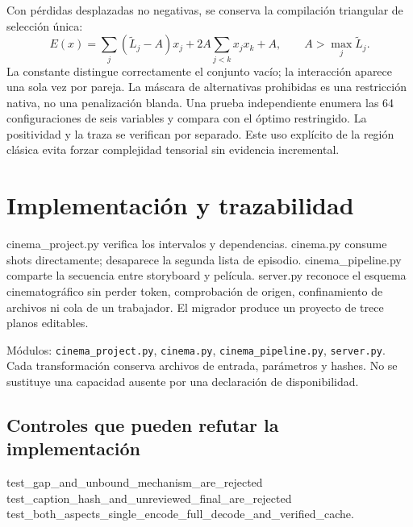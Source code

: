 \documentclass[10pt,a4paper]{article}
\begin{document}
Con pérdidas desplazadas no negativas, se conserva la compilación triangular de selección única:
\begin{equation}
E(x)=\sum_j(\widetilde L_j-A)x_j+2A\sum_{j<k}x_jx_k+A,\qquad A>\max_j\widetilde L_j.
\end{equation}
La constante distingue correctamente el conjunto vacío; la interacción aparece una sola vez por pareja. La máscara de alternativas prohibidas es una restricción nativa, no una penalización blanda. Una prueba independiente enumera las 64 configuraciones de seis variables y compara con el óptimo restringido. La positividad y la traza se verifican por separado. Este uso explícito de la región clásica evita forzar complejidad tensorial sin evidencia incremental.
\section{Implementación y trazabilidad}
cinema\_\allowbreak{}project.py verifica los intervalos y dependencias. cinema.py consume shots directamente; desaparece la segunda lista de episodio. cinema\_\allowbreak{}pipeline.py comparte la secuencia entre storyboard y película. server.py reconoce el esquema cinematográfico sin perder token, comprobación de origen, confinamiento de archivos ni cola de un trabajador. El migrador produce un proyecto de trece planos editables.

Módulos: \texttt{cinema\_\allowbreak{}project.py}, \texttt{cinema.py}, \texttt{cinema\_\allowbreak{}pipeline.py}, \texttt{server.py}. Cada transformación conserva archivos de entrada, parámetros y hashes. No se sustituye una capacidad ausente por una declaración de disponibilidad.
\subsection{Controles que pueden refutar la implementación}
\begin{flushleft}\small test\_\allowbreak{}gap\_\allowbreak{}and\_\allowbreak{}unbound\_\allowbreak{}mechanism\_\allowbreak{}are\_\allowbreak{}rejected\\ test\_\allowbreak{}caption\_\allowbreak{}hash\_\allowbreak{}and\_\allowbreak{}unreviewed\_\allowbreak{}final\_\allowbreak{}are\_\allowbreak{}rejected\\ test\_\allowbreak{}both\_\allowbreak{}aspects\_\allowbreak{}single\_\allowbreak{}encode\_\allowbreak{}full\_\allowbreak{}decode\_\allowbreak{}and\_\allowbreak{}verified\_\allowbreak{}cache.\end{flushleft}
\end{document}
